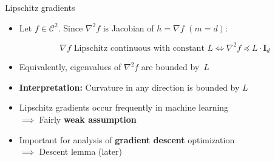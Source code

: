 \documentclass[11pt,compress,t,notes=noshow, xcolor=table]{beamer}
\begin{document}
\begin{vbframe}{Lipschitz gradients}
    \begin{itemize}
        \item Let $f\in\mathcal{C}^2$.
            Since $\nabla^2 f$ is Jacobian of $h = \nabla f$ $(m=d)$:
            
            \begin{kframe}
                \vspace{-\baselineskip}
                \begin{equation*}
                    \text{$\nabla f$ Lipschitz continuous with constant $L$} \Longleftrightarrow \nabla^2 f \preccurlyeq L \cdot \mathbf{I}_d
                \end{equation*}
            \end{kframe}
        \item Equivalently, eigenvalues of $\nabla^2 f$ are bounded by~$L$
        \item \textbf{Interpretation:} Curvature in any direction is bounded by $L$
        \item Lipschitz gradients occur frequently in machine learning \\
            $\implies$ Fairly \textbf{weak assumption}
        \item Important for analysis of \textbf{gradient descent} optimization \\
            $\implies$ Descent lemma (later)
    \end{itemize}
\end{vbframe}

\endlecture
\end{document}
